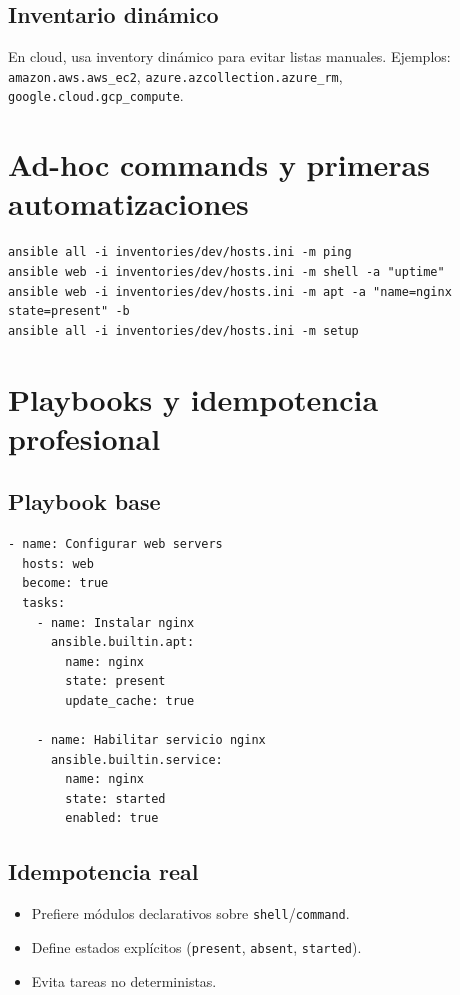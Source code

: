 \documentclass[12pt,a4paper]{article}
\begin{document}
\subsection{Inventario dinámico}
En cloud, usa inventory dinámico para evitar listas manuales. Ejemplos: \texttt{amazon.aws.aws\_ec2}, \texttt{azure.azcollection.azure\_rm}, \texttt{google.cloud.gcp\_compute}.

\section{Ad-hoc commands y primeras automatizaciones}

\begin{lstlisting}[caption=Comandos ad-hoc clave]
ansible all -i inventories/dev/hosts.ini -m ping
ansible web -i inventories/dev/hosts.ini -m shell -a "uptime"
ansible web -i inventories/dev/hosts.ini -m apt -a "name=nginx state=present" -b
ansible all -i inventories/dev/hosts.ini -m setup
\end{lstlisting}

\section{Playbooks y idempotencia profesional}

\subsection{Playbook base}
\begin{lstlisting}[caption=Instalación y servicio]
- name: Configurar web servers
  hosts: web
  become: true
  tasks:
    - name: Instalar nginx
      ansible.builtin.apt:
        name: nginx
        state: present
        update_cache: true

    - name: Habilitar servicio nginx
      ansible.builtin.service:
        name: nginx
        state: started
        enabled: true
\end{lstlisting}

\subsection{Idempotencia real}
\begin{itemize}
  \item Prefiere módulos declarativos sobre \texttt{shell}/\texttt{command}.
  \item Define estados explícitos (\texttt{present}, \texttt{absent}, \texttt{started}).
  \item Evita tareas no deterministas.
\end{itemize}
\end{document}
